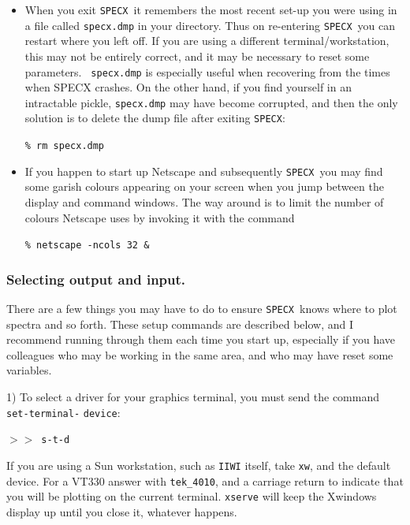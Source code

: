 \documentclass[11pt,twoside]{article}
\newcommand{\SPECX}{{\tt SPECX}}
\newcommand{\SP}{{$>\!>$}}
\begin{document}
\begin{itemize}
\SP\ \verb|$ ls -l *_map.sdf|

Or I could start up {\tt emacs} in a separate window with the aim of
making command files:

\SP\ \verb|$ emacs &|

The {\tt \$} sign is an echo of the VMS origins of \SPECX .
\item
When you exit \SPECX\ it remembers the most recent set-up you were
using in a file called {\tt specx.dmp} in your directory. Thus on
re-entering \SPECX\ you can restart where you left off. If you are
using a different terminal/workstation, this may not be entirely
correct, and it may be necessary to reset some parameters. {\tt
specx.dmp} is especially useful when recovering from the times when
SPECX crashes. On the other hand, if you find yourself in an
intractable pickle, {\tt specx.dmp} may have become corrupted, and
then the only solution is to delete the dump file after exiting
\SPECX:

\verb|% rm specx.dmp|

\item
If you happen to start up {\sc Netscape} and subsequently \SPECX\ you
may find some garish colours appearing on your screen when you jump
between the display and command windows. The way around is to limit
the number of colours {\sc Netscape} uses by invoking it with the
command

\verb|% netscape -ncols 32 &|

\end{itemize}

\subsubsection{Selecting output and input.}
\label{sec:preparing-specx}
There are a few things you may have to do to ensure \SPECX\ knows where to
plot spectra and so forth. These setup commands are described below,
and I recommend running through them each time you start up,
especially if you have colleagues who may be working in the same area,
and who may have reset some variables.

1) To select a driver for your graphics terminal, you must send the command
{\tt set-terminal-} {\tt device}:

\SP\  {\tt s-t-d}

If you are using a Sun workstation, such as {\tt IIWI} itself, take
{\tt xw}, and the default device. For a VT330 answer with
{\tt tek\_4010}, and a carriage return to indicate that you will be
plotting on the current terminal. {\tt xserve} will keep the Xwindows
display up until you close it, whatever happens.
\end{document}
